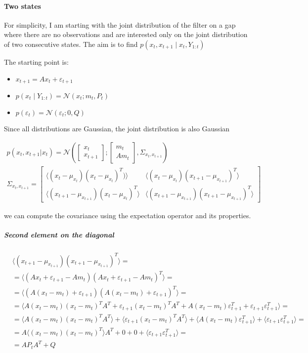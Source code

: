 \documentclass{article}
\newcommand{\E}[1]{\langle #1 \rangle} %
\newcommand{\norm}[3]{\mathcal{N}\left(#1; #2, #3\right)} %
\begin{document}
\paragraph{Two states}

For simplicity, I am starting with the joint distribution of the filter on a gap where there are no observations and are interested only on the joint distribution of two consecutive states.
The aim is to find $p(x_t, x_{t+1}\mid x_t, Y_{1:t})$

The starting point is:
\begin{itemize}
    \item $x_{t+1} = Ax_{t} + \varepsilon_{t+1}$
    \item $p(x_t \mid Y_{1:t}) = \norm{x_t}{m_t}{P_t}$
    \item $p(\varepsilon_t) = \norm{\varepsilon_t}{0}{Q}$
\end{itemize}

Since all distributions are Gaussian, the joint distribution is also Gaussian


\begin{multline}\label{p_X2_start}
p(x_t, x_{t+1}|x_t) = \norm{\begin{bmatrix}x_t\\x_{t+1}\end{bmatrix}}{\begin{bmatrix}m_t\\Am_t\end{bmatrix}}{\Sigma_{x_t, x_{t+1}}} \\
\Sigma_{x_t, x_{t+1}} = \begin{bmatrix}\E{(x_t-\mu_{x_t})(x_t-\mu_{x_t})^T)}&\E{(x_t-\mu_{x_t})(x_{t+1}-\mu_{x_{t+1}})^T}\\\E{(x_{t+1}-\mu_{x_{t+1}})(x_{t}-\mu_{x_{t}})^T}&\E{(x_{t+1}-\mu_{x_{t+1}})(x_{t+1}-\mu_{x_{t+1}})^T}\end{bmatrix}
\end{multline}

we can compute the covariance using the expectation operator and its properties.

\subparagraph{Second element on the diagonal}

\begin{equation}\label{eq:cov_x_t1_x_t1}
\begin{split}
    &\E{(x_{t+1}-\mu_{x_{t+1}})(x_{t+1}-\mu_{x_{t+1}})^T} =\\
    &=\E{(Ax_t + \varepsilon_{t+1} - Am_t)(Ax_t + \varepsilon_{t+1}- Am_t)^T} =\\
    &= \E{(A(x_t - m_t) + \varepsilon_{t+1})(A(x_t - m_t) + \varepsilon_{t+1})^T} =\\
    &=\E{A(x_t-m_t)(x_t-m_t)^TA^T + \varepsilon_{t+1}(x_t-m_t)^TA^T + A(x_t-m_t)\varepsilon_{t+1}^T + \varepsilon_{t+1}\varepsilon_{t+1}^T} =\\&=\E{A(x_t-m_t)(x_t-m_t)^TA^T} + \E{\varepsilon_{t+1}(x_t-m_t)^TA^T} + \E{A(x_t-m_t)\varepsilon_{t+1}^T} + \E{\varepsilon_{t+1}\varepsilon_{t+1}^T} =\\
    &=A\E{(x_t-m_t)(x_t-m_t)^T}A^T + 0 + 0 + \E{\varepsilon_{t+1}\varepsilon_{t+1}^T} = \\
    &=AP_tA^T + Q
\end{split}
\end{equation}
\end{document}
